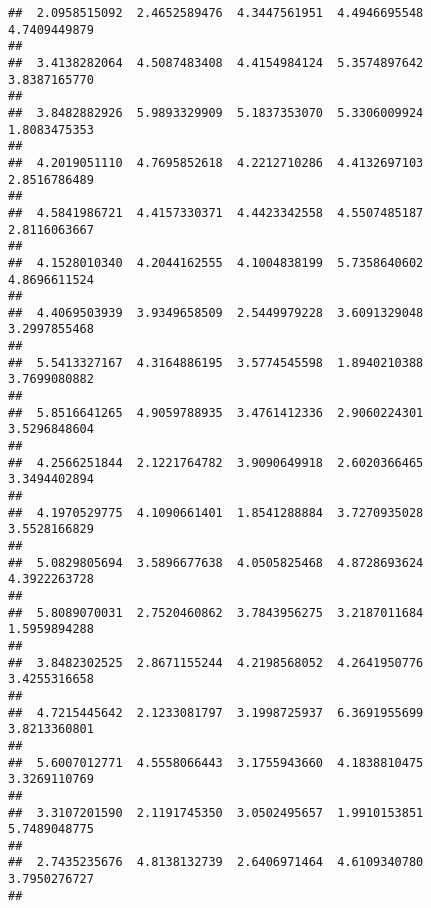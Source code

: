 \documentclass[]{article}
\begin{document}
\begin{verbatim}
##  2.0958515092  2.4652589476  4.3447561951  4.4946695548  4.7409449879 
##                                                                       
##  3.4138282064  4.5087483408  4.4154984124  5.3574897642  3.8387165770 
##                                                                       
##  3.8482882926  5.9893329909  5.1837353070  5.3306009924  1.8083475353 
##                                                                       
##  4.2019051110  4.7695852618  4.2212710286  4.4132697103  2.8516786489 
##                                                                       
##  4.5841986721  4.4157330371  4.4423342558  4.5507485187  2.8116063667 
##                                                                       
##  4.1528010340  4.2044162555  4.1004838199  5.7358640602  4.8696611524 
##                                                                       
##  4.4069503939  3.9349658509  2.5449979228  3.6091329048  3.2997855468 
##                                                                       
##  5.5413327167  4.3164886195  3.5774545598  1.8940210388  3.7699080882 
##                                                                       
##  5.8516641265  4.9059788935  3.4761412336  2.9060224301  3.5296848604 
##                                                                       
##  4.2566251844  2.1221764782  3.9090649918  2.6020366465  3.3494402894 
##                                                                       
##  4.1970529775  4.1090661401  1.8541288884  3.7270935028  3.5528166829 
##                                                                       
##  5.0829805694  3.5896677638  4.0505825468  4.8728693624  4.3922263728 
##                                                                       
##  5.8089070031  2.7520460862  3.7843956275  3.2187011684  1.5959894288 
##                                                                       
##  3.8482302525  2.8671155244  4.2198568052  4.2641950776  3.4255316658 
##                                                                       
##  4.7215445642  2.1233081797  3.1998725937  6.3691955699  3.8213360801 
##                                                                       
##  5.6007012771  4.5558066443  3.1755943660  4.1838810475  3.3269110769 
##                                                                       
##  3.3107201590  2.1191745350  3.0502495657  1.9910153851  5.7489048775 
##                                                                       
##  2.7435235676  4.8138132739  2.6406971464  4.6109340780  3.7950276727 
##                                                                       

\end{verbatim}
\end{document}
